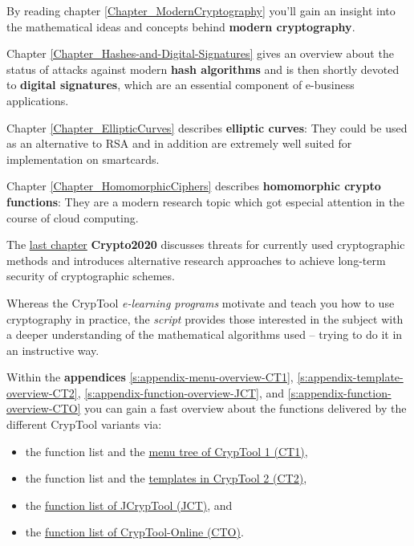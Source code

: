By reading chapter \ref{Chapter_ModernCryptography}
you'll gain an insight into the mathematical ideas and concepts behind 
{\bf modern cryptography}.

Chapter \ref{Chapter_Hashes-and-Digital-Signatures} gives
an overview about the status of attacks against modern {\bf hash algorithms}
and is then shortly devoted to {\bf digital signatures}, 
which are an essential component of e-business applications.

Chapter \ref{Chapter_EllipticCurves} describes {\bf elliptic curves}:
They could be used as an alternative to RSA and in addition are extremely
well suited for implementation on smartcards.

Chapter \ref{Chapter_HomomorphicCiphers} describes {\bf homomorphic crypto
functions}: They are a modern research topic which got especial attention
in the course of cloud computing.

The \hyperlink{Chapter_Crypto2020}{last chapter} {\bf Crypto2020}
discusses threats for currently used cryptographic methods and introduces
alternative research approaches to achieve long-term security
of cryptographic schemes.

Whereas the CrypTool \textit{e-learning programs} motivate
and teach you how to use cryptography in practice, the \textit{script} provides
those interested in the subject with a deeper understanding of the mathematical
algorithms used -- trying to do it in an instructive way.

Within the {\bf appendices}
\ref{s:appendix-menu-overview-CT1},
\ref{s:appendix-template-overview-CT2},
\ref{s:appendix-function-overview-JCT}, and
\ref{s:appendix-function-overview-CTO}
you can gain a fast overview about the functions delivered by the different
CrypTool variants via:
\begin{itemize}
  \item the function list and
        the \hyperlink{appendix-menu-overview-CT1}
                      {menu tree of CrypTool 1 (CT1)},
  \item the function list and
        the \hyperlink{appendix-template-overview-CT2}
                      {templates in CrypTool 2 (CT2)},
  \item the \hyperlink{appendix-function-overview-JCT}
                      {function list of JCrypTool (JCT)}, and
  \item the \hyperlink{appendix-function-overview-CTO}
                      {function list of CrypTool-Online (CTO)}.
\end{itemize}

